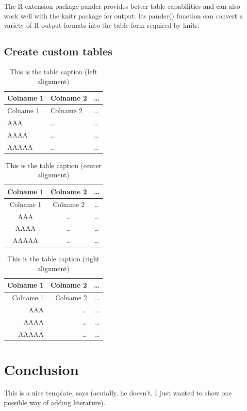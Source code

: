 \documentclass[oneside, 12pt, a4paper]{article}
\begin{document}
The R extension package pander provides better table capabilities and
can also work well with the knitr package for output. Its pander()
function can convert a variety of R output formats into the table form
required by knitr.

\hypertarget{create-custom-tables}{%
\subsection{Create custom tables}\label{create-custom-tables}}

\begin{longtable}[]{@{}lll@{}}
\caption{\centering This is the table caption (left
alignment)}\tabularnewline
\toprule
Colname 1 & Colname 2 & \ldots{}\tabularnewline
\midrule
\endfirsthead
\toprule
Colname 1 & Colname 2 & \ldots{}\tabularnewline
\midrule
\endhead
AAA & \ldots{} & \ldots{}\tabularnewline
AAAA & \ldots{} & \ldots{}\tabularnewline
AAAAA & \ldots{} & \ldots{}\tabularnewline
\bottomrule
\end{longtable}

\begin{longtable}[]{@{}ccc@{}}
\caption{\centering This is the table caption (center
alignment)}\tabularnewline
\toprule
Colname 1 & Colname 2 & \ldots{}\tabularnewline
\midrule
\endfirsthead
\toprule
Colname 1 & Colname 2 & \ldots{}\tabularnewline
\midrule
\endhead
AAA & \ldots{} & \ldots{}\tabularnewline
AAAA & \ldots{} & \ldots{}\tabularnewline
AAAAA & \ldots{} & \ldots{}\tabularnewline
\bottomrule
\end{longtable}

\begin{longtable}[]{@{}rrr@{}}
\caption{\centering This is the table caption (right
alignment)}\tabularnewline
\toprule
Colname 1 & Colname 2 & \ldots{}\tabularnewline
\midrule
\endfirsthead
\toprule
Colname 1 & Colname 2 & \ldots{}\tabularnewline
\midrule
\endhead
AAA & \ldots{} & \ldots{}\tabularnewline
AAAA & \ldots{} & \ldots{}\tabularnewline
AAAAA & \ldots{} & \ldots{}\tabularnewline
\bottomrule
\end{longtable}

\hypertarget{conclusion}{%
\section{Conclusion}\label{conclusion}}

This is a nice template, says \cite{fisher_statistical_1970} (acutally,
he doesn't. I just wanted to show one possible way of adding
literature).

\newpage
{}

\end{document}
